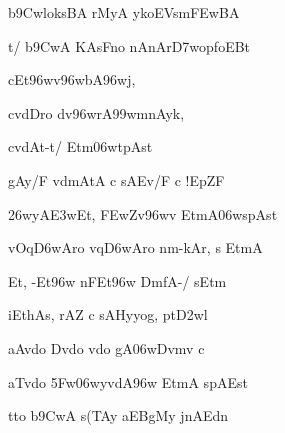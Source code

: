 {\dn b\5\39CwloksBA rMyA y\0koEVsm\3FEwBA{\dandabdn} \dontdisplaylinenum}

{\dn t/ b\5\39CwA KAsFno nAnAr\3D7wopfoEBt\? \vegdn\dontdisplaylinenum}

{\dn c\0Et\0\396wv\0\396wbA\0\396w\0j,{\dandabdn} \dontdisplaylinenum}

{\dn cv\?{\qvb}dDro d\?v\396wrA\399wmnAyk, \vegdn\dontdisplaylinenum}

{\dn cv\?{\qvb}dAt-t/ Et\0m\306wtpAst\?{\dandabdn} \dontdisplaylinenum}

{\dn gAy/F v\?dmAtA c sAEv/F c !EpZF \vegdn\dontdisplaylinenum}

{\dn \326wyA\3E3wEt, \3FEwZv\396w\4v Et\0mA\306wspAst\?{\dandabdn} \dontdisplaylinenum}

{\dn vOq\3D6wAro vq\3D6wAro nm-kAr, s Et\0mA \vegdn\dontdisplaylinenum}

{\dn {}Et, -Et\396w nFEt\396w Dm\0fA-/\2 sEt\0m \dontdisplaylinenum}

{\dn iEthAs, rAZ\2 c sA\2Hyyog, pt\3D2wl \vegdn\dontdisplaylinenum}

{\dn aAv\?{\qvb}do Dv\?{\qvb}do v\?do gA\306wDv\0m\?v c{\dandabdn} \dontdisplaylinenum}

{\dn aT\0v\?do \35Fw\306wyv\?dA\396w Et\0mA spAEst\? \vegdn\dontdisplaylinenum}

{\dn tto b\5\39CwA s(TAy aEBgMy jnAEd\0n \dontdisplaylinenum}

